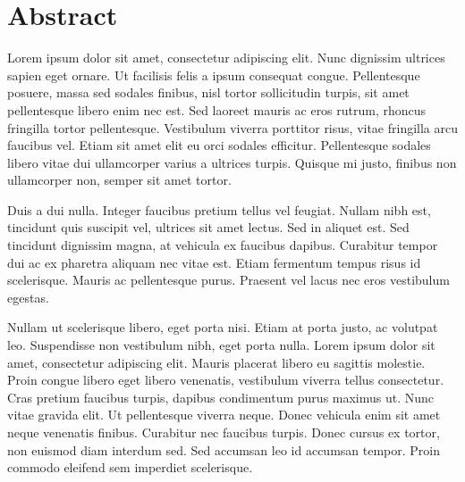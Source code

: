 \section{Abstract}\label{sec:abstract}

Lorem ipsum dolor sit amet, consectetur adipiscing elit. Nunc dignissim ultrices sapien eget ornare. Ut facilisis felis a ipsum consequat congue. Pellentesque posuere, massa sed sodales finibus, nisl tortor sollicitudin turpis, sit amet pellentesque libero enim nec est. Sed laoreet mauris ac eros rutrum, rhoncus fringilla tortor pellentesque. Vestibulum viverra porttitor risus, vitae fringilla arcu faucibus vel. Etiam sit amet elit eu orci sodales efficitur. Pellentesque sodales libero vitae dui ullamcorper varius a ultrices turpis. Quisque mi justo, finibus non ullamcorper non, semper sit amet tortor.

Duis a dui nulla. Integer faucibus pretium tellus vel feugiat. Nullam nibh est, tincidunt quis suscipit vel, ultrices sit amet lectus. Sed in aliquet est. Sed tincidunt dignissim magna, at vehicula ex faucibus dapibus. Curabitur tempor dui ac ex pharetra aliquam nec vitae est. Etiam fermentum tempus risus id scelerisque. Mauris ac pellentesque purus. Praesent vel lacus nec eros vestibulum egestas.

Nullam ut scelerisque libero, eget porta nisi. Etiam at porta justo, ac volutpat leo. Suspendisse non vestibulum nibh, eget porta nulla. Lorem ipsum dolor sit amet, consectetur adipiscing elit. Mauris placerat libero eu sagittis molestie. Proin congue libero eget libero venenatis, vestibulum viverra tellus consectetur. Cras pretium faucibus turpis, dapibus condimentum purus maximus ut. Nunc vitae gravida elit. Ut pellentesque viverra neque. Donec vehicula enim sit amet neque venenatis finibus. Curabitur nec faucibus turpis. Donec cursus ex tortor, non euismod diam interdum sed. Sed accumsan leo id accumsan tempor. Proin commodo eleifend sem imperdiet scelerisque.

